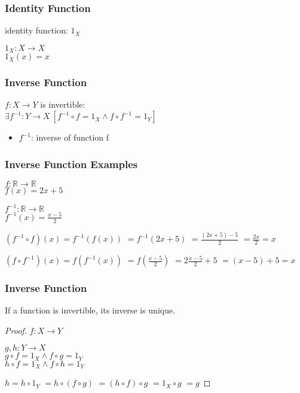 \documentclass[dvipsnames]{beamer}
\begin{document}
\begin{frame}
  \frametitle{Identity Function}

  \begin{definition}
    \alert{identity function}: $1_X$

    \medskip
    $1_X: X \rightarrow X$\\
    $1_X(x) = x$
  \end{definition}
\end{frame}

\begin{frame}
  \frametitle{Inverse Function}

  \begin{definition}
    $f: X \rightarrow Y$ is \alert{invertible}:\\
      $\exists f^{-1}: Y \rightarrow X~[f^{-1} \circ f = 1_X
                                      \wedge f \circ f^{-1} = 1_Y]$

    \begin{itemize}
      \item $f^{-1}$: \alert{inverse} of function f
    \end{itemize}
  \end{definition}
\end{frame}

\begin{frame}
  \frametitle{Inverse Function Examples}

  $f: \mathbb{R} \rightarrow \mathbb{R}$\\
  $f(x) = 2x + 5$

  \pause
  \bigskip
  $f^{-1}: \mathbb{R} \rightarrow \mathbb{R}$\\
  $f^{-1}(x) = \frac{x - 5}{2}$

  \pause
  \bigskip
  $(f^{-1} \circ f)(x) = f^{-1}(f(x))$
  \pause
  $ = f^{-1}(2x + 5)$
  \pause
  $ = \frac{(2x + 5) - 5}{2}$
  \pause
  $ = \frac{2x}{2} = x$
  \medskip

  \pause
  $(f \circ f^{-1})(x) = f(f^{-1}(x))$
  \pause
  $ = f(\frac{x - 5}{2})$
  \pause
  $ = 2 \frac{x - 5}{2} + 5$
  \pause
  $ = (x - 5) + 5 = x$
\end{frame}

\begin{frame}
  \frametitle{Inverse Function}

  \begin{theorem}
    If a function is invertible, its inverse is unique.
  \end{theorem}

  \pause
  \begin{proof}
    $f: X \rightarrow Y$

    \pause
    \medskip
    $g,h: Y \rightarrow X$\\
    $g \circ f = 1_X \wedge f \circ g = 1_Y$\\
    $h \circ f = 1_X \wedge f \circ h = 1_Y$

    \pause
    \medskip
    $h = h \circ 1_Y$
    \pause
    $ = h \circ (f \circ g)$
    \pause
    $ = (h \circ f) \circ g$
    \pause
    $ = 1_X \circ g$
    \pause
    $ = g$
  \end{proof}
\end{frame}
\end{document}
